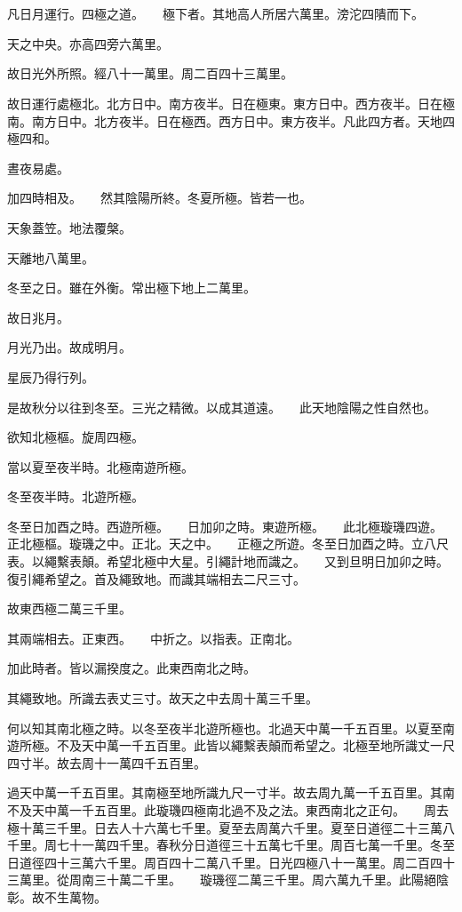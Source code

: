 \documentclass[a4paper,12pt,UTF8,twoside]{ctexbook}
\begin{document}
\chapter{}
凡日月運行。四極之道。　　極下者。其地高人所居六萬里。滂沱四隤而下。

天之中央。亦高四旁六萬里。

故日光外所照。經八十一萬里。周二百四十三萬里。

故日運行處極北。北方日中。南方夜半。日在極東。東方日中。西方夜半。日在極南。南方日中。北方夜半。日在極西。西方日中。東方夜半。凡此四方者。天地四極四和。

晝夜易處。

加四時相及。　　然其陰陽所終。冬夏所極。皆若一也。

天象蓋笠。地法覆槃。

天離地八萬里。

冬至之日。雖在外衡。常出極下地上二萬里。

故日兆月。

月光乃出。故成明月。

星辰乃得行列。

是故秋分以往到冬至。三光之精微。以成其道遠。　　此天地陰陽之性自然也。

欲知北極樞。旋周四極。

當以夏至夜半時。北極南遊所極。

冬至夜半時。北遊所極。

冬至日加酉之時。西遊所極。　　日加卯之時。東遊所極。　　此北極璇璣四遊。　　正北極樞。璇璣之中。正北。天之中。　　正極之所遊。冬至日加酉之時。立八尺表。以繩繫表顛。希望北極中大星。引繩計地而識之。　　又到旦明日加卯之時。復引繩希望之。首及繩致地。而識其端相去二尺三寸。

故東西極二萬三千里。

其兩端相去。正東西。　　中折之。以指表。正南北。

加此時者。皆以漏揆度之。此東西南北之時。

其繩致地。所識去表丈三寸。故天之中去周十萬三千里。

何以知其南北極之時。以冬至夜半北遊所極也。北過天中萬一千五百里。以夏至南遊所極。不及天中萬一千五百里。此皆以繩繫表顛而希望之。北極至地所識丈一尺四寸半。故去周十一萬四千五百里。

過天中萬一千五百里。其南極至地所識九尺一寸半。故去周九萬一千五百里。其南不及天中萬一千五百里。此璇璣四極南北過不及之法。東西南北之正句。　　周去極十萬三千里。日去人十六萬七千里。夏至去周萬六千里。夏至日道徑二十三萬八千里。周七十一萬四千里。春秋分日道徑三十五萬七千里。周百七萬一千里。冬至日道徑四十三萬六千里。周百四十二萬八千里。日光四極八十一萬里。周二百四十三萬里。從周南三十萬二千里。　　璇璣徑二萬三千里。周六萬九千里。此陽絕陰彰。故不生萬物。
\end{document}
